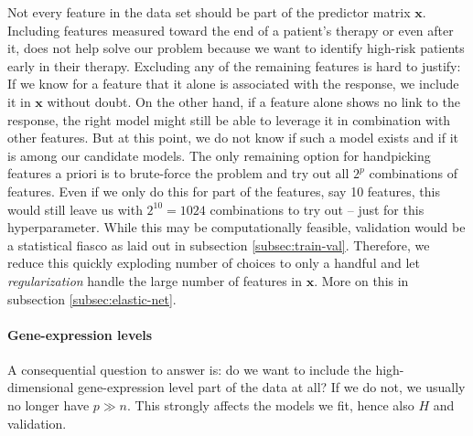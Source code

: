 Not every feature in the data set should be part of the predictor matrix $\mathbf{x}$. Including 
features measured toward the end of a patient's therapy or even after it, does not help solve 
our problem because we want to identify high-risk patients early in their therapy.
Excluding any of the remaining features is hard to justify: If we 
know for a feature that it alone is associated with the response, we include it in $\mathbf{x}$ 
without doubt.
On the other hand, if a feature alone shows no link to the response, the right model might still be 
able to leverage it in combination with other features. But at this point, we do not know if such 
a model exists and if it is among our candidate models. The only remaining option for handpicking 
features a priori is to brute-force the problem and try out all $2^p$ combinations of features.
Even if we only do this for part of the features, say \num{10} features, this would still
leave us with $2^{10} = 1024$ combinations to try out -- just for this hyperparameter. While this 
may be computationally feasible, validation would be a statistical fiasco as laid out in subsection 
\ref{subsec:train-val}. Therefore, we reduce this quickly exploding number of choices to only 
a handful and let \textit{regularization} handle the large number of features in $\mathbf{x}$. More 
on this in subsection \ref{subsec:elastic-net}.

\paragraph{Gene-expression levels}
A consequential question to answer is: do we want to include the high-dimensional
gene-expression level part of the data at all? If we do not, we usually no longer have $p \gg n$. 
This strongly affects the models we fit, hence also $H$ and validation.

